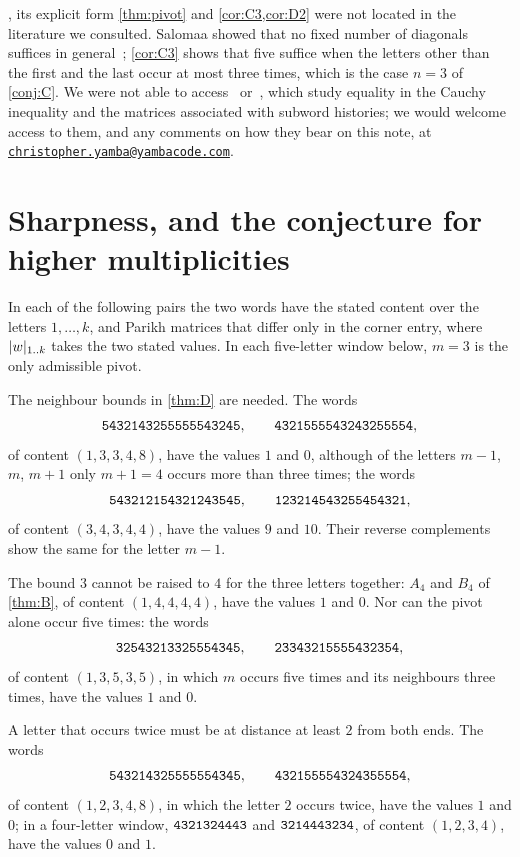 \documentclass[11pt,a4paper]{article}
\begin{document}
, its explicit form \cref{thm:pivot} and \cref{cor:C3,cor:D2} were not located in the literature we consulted. Salomaa showed that no fixed number of diagonals suffices in general~\cite[Theorem~4, p.~228]{Sal06}; \cref{cor:C3} shows that five suffice when the letters other than the first and the last occur at most three times, which is the case $n=3$ of \cref{conj:C}. We were not able to access~\cite{Sal15} or~\cite{Sal08}, which study equality in the Cauchy inequality and the matrices associated with subword histories; we would welcome access to them, and any comments on how they bear on this note, at \href{mailto:christopher.yamba@yambacode.com}{\texttt{christopher.yamba@yambacode.com}}.

\section{Sharpness, and the conjecture for higher multiplicities}\label{sec:conj}

\begin{proposition}\label{prop:sharpD}
In each of the following pairs the two words have the stated content over the letters $1,\dots,k$, and Parikh matrices that differ only in the corner entry, where $\lvert w\rvert_{1\mathinner{\ldotp\ldotp} k}$ takes the two stated values. In each five-letter window below, $m=3$ is the only admissible pivot.
\begin{parts}
\item The neighbour bounds in \cref{thm:D} are needed. The words
\[
\mathtt{5432143255555543245},\qquad\mathtt{4321555543243255554},
\]
of content $(1,3,3,4,8)$, have the values $1$ and $0$, although of the letters $m-1$, $m$, $m+1$ only $m+1=4$ occurs more than three times; the words
\[
\mathtt{543212154321243545},\qquad\mathtt{123214543255454321},
\]
of content $(3,4,3,4,4)$, have the values $9$ and $10$. Their reverse complements show the same for the letter $m-1$.
\item The bound $3$ cannot be raised to $4$ for the three letters together: $A_4$ and $B_4$ of \cref{thm:B}, of content $(1,4,4,4,4)$, have the values $1$ and $0$. Nor can the pivot alone occur five times: the words
\[
\mathtt{32543213325554345},\qquad\mathtt{23343215555432354},
\]
of content $(1,3,5,3,5)$, in which $m$ occurs five times and its neighbours three times, have the values $1$ and $0$.
\item A letter that occurs twice must be at distance at least $2$ from both ends. The words
\[
\mathtt{543214325555554345},\qquad\mathtt{432155554324355554},
\]
of content $(1,2,3,4,8)$, in which the letter $2$ occurs twice, have the values $1$ and $0$; in a four-letter window, $\mathtt{4321324443}$ and $\mathtt{3214443234}$, of content $(1,2,3,4)$, have the values $0$ and $1$.
\end{parts}
\end{proposition}
\end{document}
